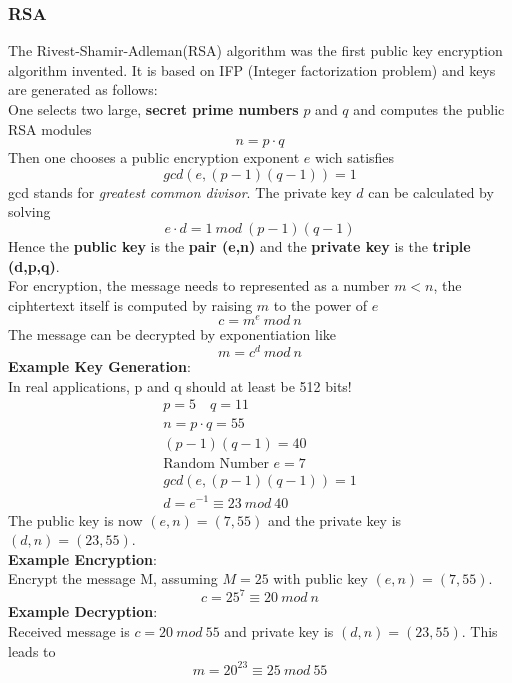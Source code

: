 \documentclass[a4paper, 10 pt, conference]{ieeeconf}
\begin{document}
\subsubsection{\textbf{RSA}}
\label{ex:rsa}
The Rivest-Shamir-Adleman(RSA) algorithm was the first public key encryption algorithm invented. It is based on IFP (Integer factorization problem) and keys are generated as follows: \\
One selects two large, \textbf{secret prime numbers} $p$ and $q$ and computes the public RSA modules
\begin{equation*}
n = p \cdot q
\end{equation*}
Then one chooses a public encryption exponent $e$ wich satisfies 
\begin{equation*}
gcd \left(e, (p-1)(q-1)\right) = 1 
\end{equation*}
gcd stands for \emph{greatest common divisor}. The private key $d$ can be calculated by solving
\begin{equation*}
e \cdot d = 1 \ mod \ (p-1)(q-1)
\end{equation*}
Hence the \textbf{public key} is the \textbf{pair (e,n)} and the \textbf{private key} is the \textbf{triple (d,p,q)}.\\
For encryption, the message needs to represented as a number $m < n$, the ciphtertext itself is computed by raising $m$ to the power of $e$
\begin{equation*}
c = m^{e} \ mod \ n
\end{equation*}
The message can be decrypted by exponentiation like
\begin{equation}
m  = c^{d} \ mod \ n
\end{equation}
\textbf{Example Key Generation}: \\
In real applications, p and q should at least be 512 bits!
\begin{align*}
p = 5 \quad q = 11 \\
n = p \cdot q = 55 \\
(p-1)(q-1) = 40 \\
\text{Random Number }e = 7 \\
gcd(e,(p-1)(q-1)) = 1 \\
d = e^{-1} \equiv 23 \ mod \ 40
\end{align*}
The public key is now $(e,n) = (7,55)$ and the private key is $(d,n) = (23,55)$. \\
\textbf{Example Encryption}: \\
\label{ex:rsa}
Encrypt the message M, assuming $M=25$ with public key $(e,n) = (7,55)$. 
\begin{equation*}
c = 25 ^{7} \equiv 20 \ mod \ n
\end{equation*}
\textbf{Example Decryption}: \\
Received message is $c = 20 \ mod \ 55$ and private key is $(d,n) = (23,55)$. This leads to 
\begin{equation*}
m = 20^{23} \equiv 25 \ mod \ 55
\end{equation*}
\end{document}
